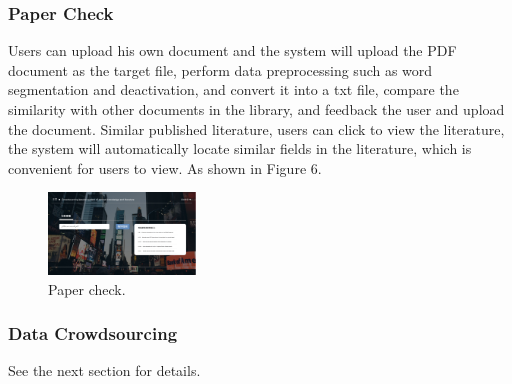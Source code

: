 \subsubsection{Paper Check}
Users can upload his own document and the system will upload the PDF document as the target file, perform data preprocessing such as word segmentation and deactivation, and convert it into a txt file, compare the similarity with other documents in the library, and feedback the user and upload the document. Similar published literature, users can click to view the literature, the system will automatically locate similar fields in the literature, which is convenient for users to view. As shown in Figure 6.
\begin{figure}
	\includegraphics[width=0.35\textwidth]{figures/pic6.png}
	\caption{Paper check.}
\end{figure}

\subsubsection{Data Crowdsourcing}
See the next section for details.

